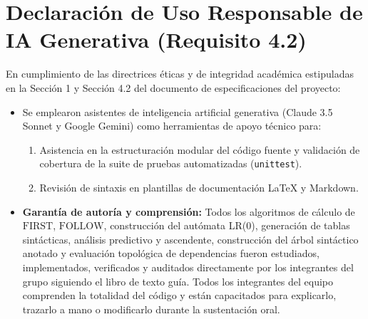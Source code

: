 \documentclass[11pt,a4paper]{article}
\begin{document}
\section{Declaración de Uso Responsable de IA Generativa (Requisito 4.2)}

En cumplimiento de las directrices éticas y de integridad académica estipuladas en la Sección 1 y Sección 4.2 del documento de especificaciones del proyecto:
\begin{itemize}
    \item Se emplearon asistentes de inteligencia artificial generativa (Claude 3.5 Sonnet y Google Gemini) como herramientas de apoyo técnico para:
    \begin{enumerate}
        \item Asistencia en la estructuración modular del código fuente y validación de cobertura de la suite de pruebas automatizadas (\texttt{unittest}).
        \item Revisión de sintaxis en plantillas de documentación \LaTeX{} y Markdown.
    \end{enumerate}
    \item \textbf{Garantía de autoría y comprensión:} Todos los algoritmos de cálculo de $\text{FIRST}$, $\text{FOLLOW}$, construcción del autómata LR(0), generación de tablas sintácticas, análisis predictivo y ascendente, construcción del árbol sintáctico anotado y evaluación topológica de dependencias fueron estudiados, implementados, verificados y auditados directamente por los integrantes del grupo siguiendo el libro de texto guía. Todos los integrantes del equipo comprenden la totalidad del código y están capacitados para explicarlo, trazarlo a mano o modificarlo durante la sustentación oral.
\end{itemize}
\end{document}
